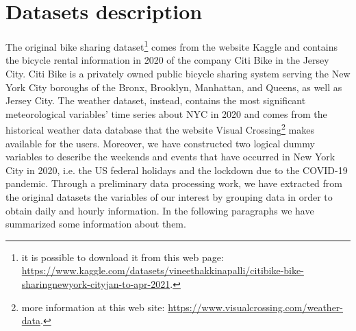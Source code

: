 \section{Datasets description}
The original bike sharing dataset\footnote{it is possible to download it from this web page: \url{https://www.kaggle.com/datasets/vineethakkinapalli/citibike-bike-sharingnewyork-cityjan-to-apr-2021}.} comes from the website Kaggle and contains the bicycle rental information in \num{2020} of the company Citi Bike in the Jersey City. Citi Bike is a privately owned public bicycle sharing system serving the New York City boroughs of the Bronx, Brooklyn, Manhattan, and Queens, as well as Jersey City. The weather dataset, instead, contains the most significant meteorological variables' time series about NYC in \num{2020} and comes from the historical weather data database that the website Visual Crossing\footnote{more information at this web site: \url{https://www.visualcrossing.com/weather-data}.} makes available for the users. Moreover, we have constructed two logical dummy variables to describe the weekends and events that have occurred in New York City in \num{2020}, i.e. the US federal holidays and the lockdown due to the COVID-\num{19} pandemic.
Through a preliminary data processing work, we have extracted from the original datasets the variables of our interest by grouping data in order to obtain daily and hourly information. In the following paragraphs we have summarized some information about them.

